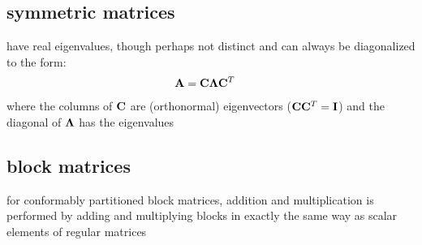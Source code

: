 \documentclass[12pt]{article}
\begin{document}
\subsection{symmetric matrices}
have real eigenvalues, though perhaps not distinct and can always
be diagonalized to the form: 
\begin{align}
{\mathbf A} & = {\mathbf C} {\boldsymbol \Lambda} {\mathbf C}^T
\end{align}
where the columns of ${\mathbf C}$
are (orthonormal) eigenvectors (\ie ${\mathbf C} {\mathbf C}^T = {\mathbf I}$) and the
diagonal of ${\boldsymbol \Lambda}$ has the eigenvalues

\subsection{block matrices}
for conformably partitioned block matrices, addition and
multiplication is performed by adding and multiplying blocks in
exactly the same way as scalar elements of regular matrices
\end{document}

